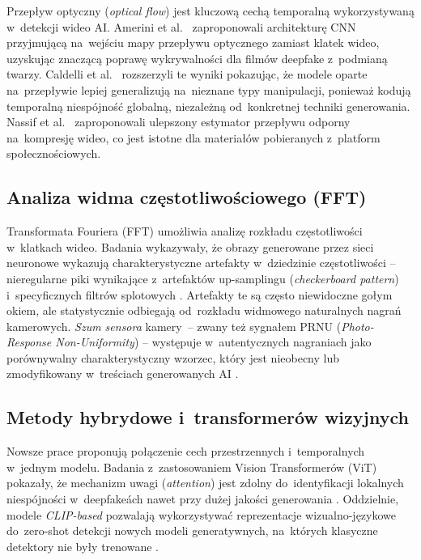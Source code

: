 Przep\l{}yw optyczny (\textit{optical flow}) jest kluczow\k{a} cech\k{a}
temporaln\k{a} wykorzystywan\k{a} w~detekcji wideo AI.
Amerini et al.\ \cite{Amerini2019ICCV} zaproponowali
architektur\k{e} CNN przyjmuj\k{a}c\k{a} na~wej\'{s}ciu mapy przep\l{}ywu
optycznego zamiast klatek wideo, uzyskuj\k{a}c znacz\k{a}c\k{a} popraw\k{e}
wykrywalno\'{s}ci dla film\'{o}w deepfake z~podmian\k{a} twarzy.
Caldelli et al.\ \cite{Caldelli2021OpticalFlowCNN} rozszerzyli
te wyniki pokazuj\k{a}c, \.{z}e modele oparte na~przep\l{}ywie lepiej
generalizuj\k{a} na~nieznane typy manipulacji, poniewa\.{z} koduj\k{a}
temporaln\k{a} niesp\'{o}jno\'{s}\'{c} globaln\k{a}, niezale\.{z}n\k{a} od~konkretnej
techniki generowania.
Nassif et al.\ \cite{Nassif2022ImprovedOpticalFlow}
zaproponowali ulepszony estymator przep\l{}ywu odporny na~kompresj\k{e} wideo,
co jest istotne dla materia\l{}\'{o}w pobieranych z~platform spo\l{}eczno\'{s}ciowych.

\subsection{Analiza widma cz\k{e}stotliwo\'{s}ciowego (FFT)}

Transformata Fouriera (FFT) umo\.{z}liwia analiz\k{e} rozk\l{}adu
cz\k{e}stotliwo\'{s}ci w~klatkach wideo. Badania wykazywa\l{}y,
\.{z}e obrazy generowane przez sieci neuronowe wykazuj\k{a} charakterystyczne
artefakty w~dziedzinie cz\k{e}stotliwo\'{s}ci -- nieregularne piki
wynikaj\k{a}ce z~artefakt\'{o}w up-samplingu (\textit{checkerboard pattern})
i~specyficznych filtr\'{o}w splotowych \cite{Frank2020FrequencyDNN}.
Artefakty te s\k{a} cz\k{e}sto niewidoczne go\l{}ym okiem, ale statystycznie
odbiegaj\k{a} od~rozk\l{}adu widmowego naturalnych nagra\'{n} kamerowych.
\textit{Szum sensora} kamery~-- zwany te\.{z} sygna\l{}em PRNU (\textit{Photo-Response
Non-Uniformity}) -- wyst\k{e}puje w~autentycznych nagraniach jako por\'{o}wnywalny
charakterystyczny wzorzec, kt\'{o}ry jest nieobecny lub zmodyfikowany w~tre\'{s}ciach
generowanych AI \cite{Wang2024ReliabilityPerspective}.

\subsection{Metody hybrydowe i~transformer\'{o}w wizyjnych}

Nowsze prace proponuj\k{a} po\l{}\k{a}czenie cech przestrzennych i~temporalnych
w~jednym modelu. Badania z~zastosowaniem Vision Transformer\'{o}w (ViT)
pokaza\l{}y, \.{z}e mechanizm uwagi (\textit{attention}) jest zdolny
do~identyfikacji lokalnych niesp\'{o}jno\'{s}ci w~deepfake\'ach nawet przy
du\.{z}ej jako\'{s}ci generowania \cite{Dong2023CLIPDeepfake}.
Oddzielnie, modele \textit{CLIP-based} pozwalaj\k{a} wykorzystywa\'{c}
reprezentacje wizualno-j\k{e}zykowe do~zero-shot detekcji nowych modeli
generatywnych, na~kt\'{o}rych klasyczne detektory nie by\l{}y trenowane
\cite{Li2025AIGCSurvey}.

